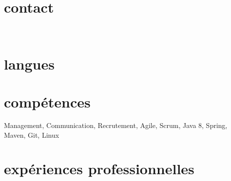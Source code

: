 \documentclass{friggeri-cv} 	%
\begin{document}


\begin{aside} %
\section{contact}
\myAddress
~
\myPhoneNumber
\myReferences
\section{langues}
\myLanguages
\section{compétences}
Management, Communication,
Recrutement, 
Agile, Scrum,
Java 8, Spring,
Maven, Git,
Linux
\end{aside}

\section{expériences professionnelles}
\end{document}
